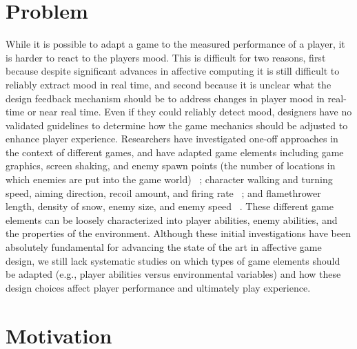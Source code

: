 \section{Problem}

While it is possible to adapt a game to the measured performance of a player,
it is harder to react to the players mood. This is difficult for two reasons, first because despite significant advances in affective computing
it is still difficult to reliably extract mood in real time, and second because it is unclear what the design feedback mechanism should be to address changes in player mood in real-time or near real time. Even if they could reliably detect mood, designers have no validated guidelines to determine how the game mechanics should be adjusted to enhance player experience. Researchers have investigated one-off approaches in the context of different games, and have adapted game elements including game graphics, screen shaking, and enemy spawn points (the number of locations in which enemies are put into the game world) ~\cite{dekker2007please}; character walking and turning speed, aiming direction, recoil amount, and firing rate ~\cite{epp2011identifying}; and flamethrower length, density of snow, enemy size, and enemy speed ~\cite{nacke2011biofeedback}. These different game elements can be loosely characterized into player abilities, enemy abilities, and the properties of the environment. Although these initial investigations have been absolutely fundamental for advancing the state of the art in affective game design, we still lack systematic studies on which types of game elements should be adapted (e.g., player abilities versus environmental variables) and how these design choices affect player performance and ultimately play experience.

\section{Motivation}

